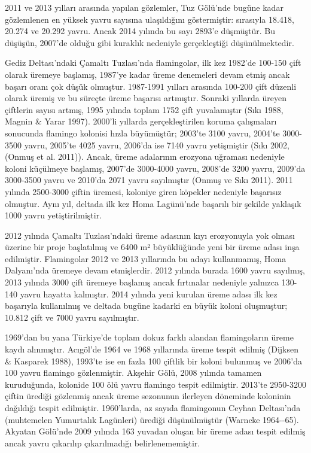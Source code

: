 \documentclass[
  letterpaper,
  DIV=11,
  numbers=noendperiod]{scrreprt}
\begin{document}
2011 ve 2013 yılları arasında yapılan gözlemler, Tuz Gölü'nde bugüne
kadar gözlemlenen en yüksek yavru sayısına ulaşıldığını göstermiştir:
sırasıyla 18.418, 20.274 ve 20.292 yavru. Ancak 2014 yılında bu sayı
2893'e düşmüştür. Bu düşüşün, 2007'de olduğu gibi kuraklık nedeniyle
gerçekleştiği düşünülmektedir.

Gediz Deltası'ndaki Çamaltı Tuzlası'nda flamingolar, ilk kez 1982'de
100-150 çift olarak üremeye başlamış, 1987'ye kadar üreme denemeleri
devam etmiş ancak başarı oranı çok düşük olmuştur. 1987-1991 yılları
arasında 100-200 çift düzenli olarak üremiş ve bu süreçte üreme başarısı
artmıştır. Sonraki yıllarda üreyen çiftlerin sayısı artmış, 1995 yılında
toplam 1752 çift yuvalamıştır (Sıkı 1988, Magnin \& Yarar 1997). 2000'li
yıllarda gerçekleştirilen koruma çalışmaları sonucunda flamingo kolonisi
hızla büyümüştür; 2003'te 3100 yavru, 2004'te 3000-3500 yavru, 2005'te
4025 yavru, 2006'da ise 7140 yavru yetişmiştir (Sıkı 2002, (Onmuş et al.
2011)). Ancak, üreme adalarının erozyona uğraması nedeniyle koloni
küçülmeye başlamış, 2007'de 3000-4000 yavru, 2008'de 3200 yavru, 2009'da
3000-3500 yavru ve 2010'da 2071 yavru sayılmıştır (Onmuş ve Sıkı 2011).
2011 yılında 2500-3000 çiftin üremesi, koloniye giren köpekler nedeniyle
başarısız olmuştur. Aynı yıl, deltada ilk kez Homa Lagünü'nde başarılı
bir şekilde yaklaşık 1000 yavru yetiştirilmiştir.

2012 yılında Çamaltı Tuzlası'ndaki üreme adasının kıyı erozyonuyla yok
olması üzerine bir proje başlatılmış ve 6400 m² büyüklüğünde yeni bir
üreme adası inşa edilmiştir. Flamingolar 2012 ve 2013 yıllarında bu
adayı kullanmamış, Homa Dalyanı'nda üremeye devam etmişlerdir. 2012
yılında burada 1600 yavru sayılmış, 2013 yılında 3000 çift üremeye
başlamış ancak fırtınalar nedeniyle yalnızca 130-140 yavru hayatta
kalmıştır. 2014 yılında yeni kurulan üreme adası ilk kez başarıyla
kullanılmış ve deltada bugüne kadarki en büyük koloni oluşmuştur; 10.812
çift ve 7000 yavru sayılmıştır.

1969'dan bu yana Türkiye'de toplam dokuz farklı alandan flamingoların
üreme kaydı alınmıştır. Acıgöl'de 1964 ve 1968 yıllarında üreme tespit
edilmiş (Dijksen \& Kasparek 1988), 1993'te ise en fazla 100 çiftlik bir
koloni bulunmuş ve 2006'da 100 yavru flamingo gözlenmiştir. Akşehir
Gölü, 2008 yılında tamamen kuruduğunda, kolonide 100 ölü yavru flamingo
tespit edilmiştir. 2013'te 2950-3200 çiftin ürediği gözlenmiş ancak
üreme sezonunun ilerleyen döneminde koloninin dağıldığı tespit
edilmiştir. 1960'larda, az sayıda flamingonun Ceyhan Deltası'nda
(muhtemelen Yumurtalık Lagünleri) ürediği düşünülmüştür (Warncke
1964-\/-65). Akyatan Gölü'nde 2009 yılında 163 yuvadan oluşan bir üreme
adası tespit edilmiş ancak yavru çıkarılıp çıkarılmadığı
belirlenememiştir.
\end{document}
